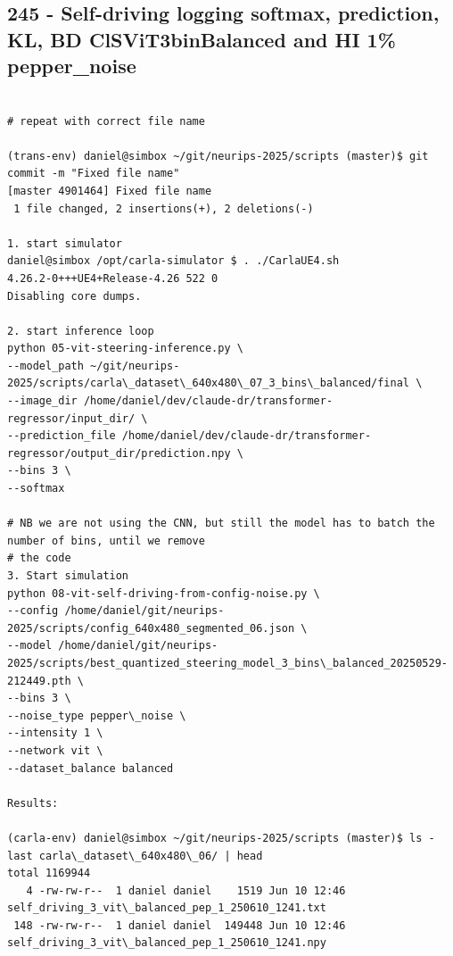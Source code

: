 \subsection{245 - Self-driving logging softmax, prediction, KL, BD ClSViT3binBalanced and HI 1\% pepper\_noise}
\label{app_res:245}

\begin{verbatim}

# repeat with correct file name

(trans-env) daniel@simbox ~/git/neurips-2025/scripts (master)$ git commit -m "Fixed file name"
[master 4901464] Fixed file name
 1 file changed, 2 insertions(+), 2 deletions(-)
 
1. start simulator
daniel@simbox /opt/carla-simulator $ . ./CarlaUE4.sh 
4.26.2-0+++UE4+Release-4.26 522 0
Disabling core dumps.

2. start inference loop
python 05-vit-steering-inference.py \
--model_path ~/git/neurips-2025/scripts/carla\_dataset\_640x480\_07_3_bins\_balanced/final \
--image_dir /home/daniel/dev/claude-dr/transformer-regressor/input_dir/ \
--prediction_file /home/daniel/dev/claude-dr/transformer-regressor/output_dir/prediction.npy \
--bins 3 \
--softmax

# NB we are not using the CNN, but still the model has to batch the number of bins, until we remove
# the code
3. Start simulation
python 08-vit-self-driving-from-config-noise.py \
--config /home/daniel/git/neurips-2025/scripts/config_640x480_segmented_06.json \
--model /home/daniel/git/neurips-2025/scripts/best_quantized_steering_model_3_bins\_balanced_20250529-212449.pth \
--bins 3 \
--noise_type pepper\_noise \
--intensity 1 \
--network vit \
--dataset_balance balanced

Results:

(carla-env) daniel@simbox ~/git/neurips-2025/scripts (master)$ ls -last carla\_dataset\_640x480\_06/ | head
total 1169944
   4 -rw-rw-r--  1 daniel daniel    1519 Jun 10 12:46 self_driving_3_vit\_balanced_pep_1_250610_1241.txt
 148 -rw-rw-r--  1 daniel daniel  149448 Jun 10 12:46 self_driving_3_vit\_balanced_pep_1_250610_1241.npy


\end{verbatim}


